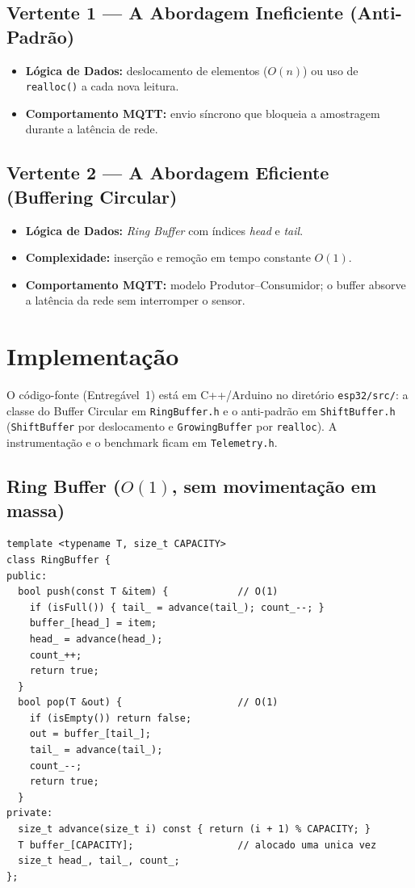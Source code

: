 \documentclass[11pt,a4paper]{article}
\begin{document}
\subsection{Vertente 1 --- A Abordagem Ineficiente (Anti-Padrão)}
\begin{itemize}
  \item \textbf{Lógica de Dados:} deslocamento de elementos ($O(n)$) ou uso de
  \texttt{realloc()} a cada nova leitura.
  \item \textbf{Comportamento MQTT:} envio síncrono que bloqueia a amostragem
  durante a latência de rede.
\end{itemize}

\subsection{Vertente 2 --- A Abordagem Eficiente (Buffering Circular)}
\begin{itemize}
  \item \textbf{Lógica de Dados:} \emph{Ring Buffer} com índices \emph{head} e
  \emph{tail}.
  \item \textbf{Complexidade:} inserção e remoção em tempo constante $O(1)$.
  \item \textbf{Comportamento MQTT:} modelo Produtor--Consumidor; o buffer
  absorve a latência da rede sem interromper o sensor.
\end{itemize}

\section{Implementação}
O código-fonte (Entregável~1) está em C++/Arduino no diretório
\texttt{esp32/src/}: a classe do Buffer Circular em \texttt{RingBuffer.h} e o
anti-padrão em \texttt{ShiftBuffer.h} (\texttt{ShiftBuffer} por deslocamento e
\texttt{GrowingBuffer} por \texttt{realloc}). A instrumentação e o benchmark
ficam em \texttt{Telemetry.h}.

\subsection{Ring Buffer ($O(1)$, sem movimentação em massa)}
\begin{lstlisting}
template <typename T, size_t CAPACITY>
class RingBuffer {
public:
  bool push(const T &item) {            // O(1)
    if (isFull()) { tail_ = advance(tail_); count_--; }
    buffer_[head_] = item;
    head_ = advance(head_);
    count_++;
    return true;
  }
  bool pop(T &out) {                    // O(1)
    if (isEmpty()) return false;
    out = buffer_[tail_];
    tail_ = advance(tail_);
    count_--;
    return true;
  }
private:
  size_t advance(size_t i) const { return (i + 1) % CAPACITY; }
  T buffer_[CAPACITY];                  // alocado uma unica vez
  size_t head_, tail_, count_;
};
\end{lstlisting}
\end{document}
